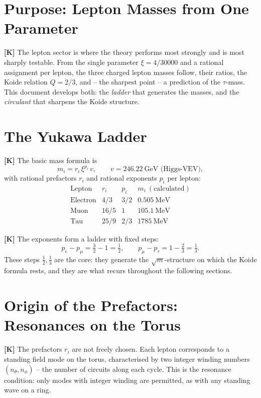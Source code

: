 \section{Purpose: Lepton Masses from One Parameter}

\textbf{[K]} The lepton sector is where the theory performs most strongly
and is most sharply testable. From the single parameter $\xi = 4/30000$ and
a rational assignment per lepton, the three charged lepton masses follow, their
ratios, the Koide relation $Q=2/3$, and -- the sharpest point -- a
prediction of the $\tau$-mass. This document develops both: the \emph{ladder} that
generates the masses, and the \emph{circulant} that sharpens the Koide structure.

\section{The Yukawa Ladder}

\textbf{[K]} The basic mass formula is
\[
  m_i = r_i\,\xi^{p_i}\,v, \qquad v = 246{.}22\ \text{GeV (Higgs-VEV)},
\]
with rational prefactors $r_i$ and rational exponents $p_i$ per lepton:
\[
  \begin{array}{lccc}
    \text{Lepton} & r_i & p_i & m_i\ (\text{calculated}) \\[2pt]
    \text{Electron} & 4/3 & 3/2 & 0{.}505\ \text{MeV} \\
    \text{Muon}     & 16/5 & 1  & 105{.}1\ \text{MeV} \\
    \text{Tau}      & 25/9 & 2/3 & 1785\ \text{MeV}
  \end{array}
\]

\textbf{[K]} The exponents form a ladder with fixed steps:
\[
  p_e - p_\mu = \tfrac32 - 1 = \tfrac12, \qquad
  p_\mu - p_\tau = 1 - \tfrac23 = \tfrac13.
\]
These steps $\tfrac12, \tfrac13$ are the core: they generate the
$\sqrt{m}$-structure on which the Koide formula rests, and they are what
recurs throughout the following sections.

\section{Origin of the Prefactors: Resonances on the Torus}

\textbf{[K]} The prefactors $r_i$ are not freely chosen. Each lepton
corresponds to a standing field mode on the torus, characterised by two
integer winding numbers $(n_\theta, n_\phi)$ -- the number of circuits along
each cycle. This is the resonance condition: only modes with integer winding
are permitted, as with any standing wave on a ring.

